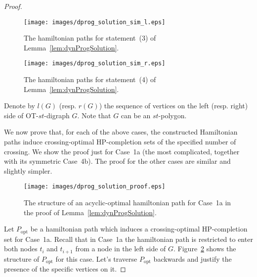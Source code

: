 \documentclass{myllncs-mixalis}
\begin{document}
\begin{proof}
\begin{figure}[htb]
  \begin{minipage}{.47\textwidth}
    \centering
    \texttt{[image: images/dprog\_solution\_sim\_l.eps]}
    \caption{The hamiltonian paths for statement~(3) of Lemma~\ref{lem:dynProgSolution}.}
    \label{fig:dynProgSolutionRIGHT-L}
  \end{minipage}
  \hfill
    \begin{minipage}{.47\textwidth}
    \centering
    \texttt{[image: images/dprog\_solution\_sim\_r.eps]}
    \caption{The hamiltonian paths for statement~(4) of Lemma~\ref{lem:dynProgSolution}.}
    \label{fig:dynProgSolutionRIGHT-R}
  \end{minipage}
\end{figure}

Denote by $l(G)$ (resp. $r(G)$) the sequence of vertices on the left
(resp. right) side of OT-$st$-digraph $G$. Note that $G$ can be an
$st$-polygon.

We now prove that, for each of the above cases, the  constructed
Hamiltonian paths  induce  crossing-optimal HP-completion sets of
the specified number of crossing. We show the proof just for Case~1a
(the most complicated, together with its symmetric Case~4b). The
proof for the other cases are similar and slightly simpler.

\begin{figure}[htb]
    \centering
    \texttt{[image: images/dprog\_solution\_proof.eps]}
    \caption{The structure of an acyclic-optimal hamiltonian path for Case~1a in the proof
    of Lemma~\ref{lem:dynProgSolution}.}
    \label{fig:dynProgSolutionProof}
\end{figure}

Let $P_{\mathrm{opt}}$ be a hamiltonian path which induces a
crossing-optimal HP-completion set for Case~1a. Recall that in
Case~1a the hamiltonian path is restricted to enter both nodes $t_i$
and $t_{i+1}$ from a node in the left side of $G$.
Figure~\ref{fig:dynProgSolutionProof} shows the structure of
$P_{\mathrm{opt}}$  for this case. Let's traverse $P_{\mathrm{opt}}$
backwards and justify the presence of the specific vertices on it.


\end{proof}
\end{document}
